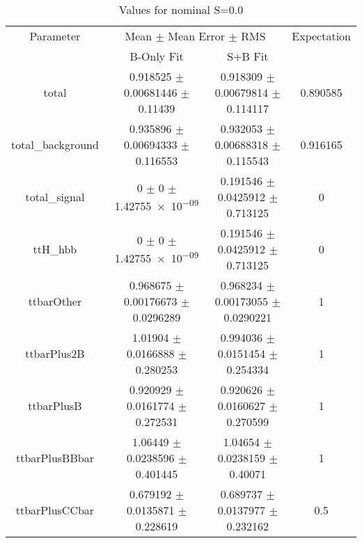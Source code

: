 \begin{table}
\centering
\caption{Values for nominal S=0.0}
\begin{tabular}{cccc}
\toprule
Parameter & \multicolumn{2}{c}{Mean $\pm$ Mean Error $\pm$ RMS} & Expectation\\
 & B-Only Fit & S+B Fit & \\
\midrule
total & \num{0.918525} $\pm$ \num{0.00681446} $\pm$ \num{0.11439} & \num{0.918309} $\pm$ \num{0.00679814} $\pm$ \num{0.114117} & \num{0.890585}\\
total\_background & \num{0.935896} $\pm$ \num{0.00694333} $\pm$ \num{0.116553} & \num{0.932053} $\pm$ \num{0.00688318} $\pm$ \num{0.115543} & \num{0.916165}\\
total\_signal & \num{0} $\pm$ \num{0} $\pm$ \num{1.42755e-09} & \num{0.191546} $\pm$ \num{0.0425912} $\pm$ \num{0.713125} & \num{0}\\
ttH\_hbb & \num{0} $\pm$ \num{0} $\pm$ \num{1.42755e-09} & \num{0.191546} $\pm$ \num{0.0425912} $\pm$ \num{0.713125} & \num{0}\\
ttbarOther & \num{0.968675} $\pm$ \num{0.00176673} $\pm$ \num{0.0296289} & \num{0.968234} $\pm$ \num{0.00173055} $\pm$ \num{0.0290221} & \num{1}\\
ttbarPlus2B & \num{1.01904} $\pm$ \num{0.0166888} $\pm$ \num{0.280253} & \num{0.994036} $\pm$ \num{0.0151454} $\pm$ \num{0.254334} & \num{1}\\
ttbarPlusB & \num{0.920929} $\pm$ \num{0.0161774} $\pm$ \num{0.272531} & \num{0.920626} $\pm$ \num{0.0160627} $\pm$ \num{0.270599} & \num{1}\\
ttbarPlusBBbar & \num{1.06449} $\pm$ \num{0.0238596} $\pm$ \num{0.401445} & \num{1.04654} $\pm$ \num{0.0238159} $\pm$ \num{0.40071} & \num{1}\\
ttbarPlusCCbar & \num{0.679192} $\pm$ \num{0.0135871} $\pm$ \num{0.228619} & \num{0.689737} $\pm$ \num{0.0137977} $\pm$ \num{0.232162} & \num{0.5}\\
\bottomrule
\end{tabular}
\end{table}